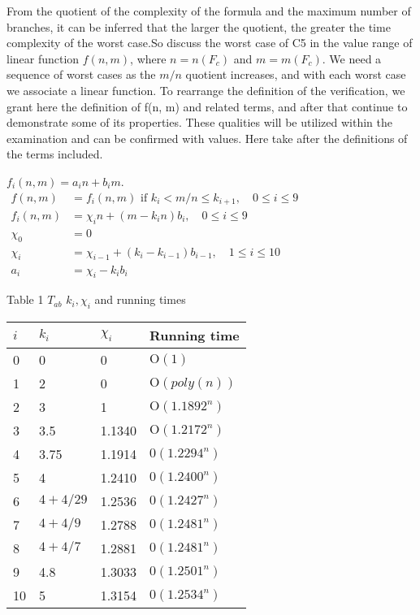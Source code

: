\documentclass{sigchi}
\begin{document}
From the quotient of the complexity of the formula and the maximum number of branches, it can be inferred that the larger the quotient, the greater the time complexity of the worst case.So discuss the worst case of C5 in the value range of linear function $f\left(n,m\right)$, where $n=n(F_{c})$ and $m=m(F_{c})$. 
We need a sequence of worst cases as the $m / n$ quotient increases, and with each worst case we associate a linear function. To rearrange the definition of the verification, we grant here the definition of f(n, m) and related terms, and after that continue to demonstrate some of its properties. These qualities will be utilized within the examination and can be confirmed with values. 
Here take after the deﬁnitions of the terms included.
\begin{center}
	$f_{i}(n, m)=a_{i} n+b_{i} m$. \\
	$\begin{aligned} f(n, m) &=f_{i}(n, m) \text { if } k_{i}<m / n \leqslant k_{i+1}, \quad 0 \leqslant i \leqslant 9 \\ f_{i}(n, m) &=\chi_{i} n+\left(m-k_{i} n\right) b_{i}, \quad 0 \leqslant i \leqslant 9 \\ \chi_{0} &=0 \\ \chi_{i} &=\chi_{i-1}+\left(k_{i}-k_{i-1}\right) b_{i-1}, \quad 1 \leqslant i \leqslant 10 \\ a_{i} &=\chi_{i}-k_{i} b_{i} \end{aligned}$\\
\end{center}

\begin{center}
	Table 1 $T_{a b}$
	$k_{i}, \chi_{i}$ and running times \\
	\begin{tabular}{llll}
		\hline$i$ & $k_{i}$ & $\chi_{i}$ & Running time \\
		\hline 0 & 0 & 0 & $\mathrm{O}(1)$ \\
		1 & 2 & 0 & $\mathrm{O}(p o l y(n))$ \\
		2 & 3 & 1& $\mathrm{O}\left(1.1892^{n}\right)$ \\
		3 & 3.5 &1.1340& $\mathrm{O}\left(1.2172^{n}\right)$ \\
		4 & 3.75&1.1914 & $0\left(1.2294^{n}\right)$ \\
		5 & 4 & 1.2410&$0\left(1.2400^{n}\right)$ \\
		6 & $4+4 / 29$ & 1.2536& $0\left(1.2427^{n}\right)$ \\
		7 & $4+4 / 9$ &1.2788& $0\left(1.2481^{n}\right)$ \\
		8 & $4+4 / 7$ &1.2881& $0\left(1.2481^{n}\right)$ \\
		9 & 4.8 &1.3033& $0\left(1.2501^{n}\right)$ \\
		10 & 5 & 1.3154& $0\left(1.2534^{n}\right)$ \\
		\hline
	\end{tabular}\\
	
\end{center}
\end{document}
